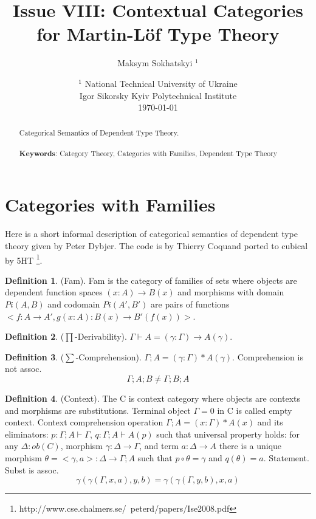 \documentclass{article}
\theoremstyle{definition}
\newtheorem{definition}{Definition}
\begin{document}
 \title{Issue VIII: Contextual Categories \\ for Martin-Löf Type Theory}
\author{Maksym Sokhatskyi $^1$}
\date{ $^1$ National Technical University of Ukraine \\
       \small Igor Sikorsky Kyiv Polytechnical Institute \\
       \today }

\maketitle

\begin{abstract}

Categorical Semantics of Dependent Type Theory.
\\
\\
{\bf Keywords}: Category Theory, Categories with Families, Dependent Type Theory
\end{abstract}
\tableofcontents

\newpage
\section{Categories with Families}

Here is a short informal description of
categorical semantics of dependent type theory given by Peter Dybjer.
The code is by Thierry Coquand ported to cubical by 5HT
\footnote{http://www.cse.chalmers.se/~peterd/papers/Ise2008.pdf}.

\begin{definition} (Fam). Fam is the category of families
of sets where objects are dependent function
spaces $(x:A)\rightarrow B(x)$ and morphisms with domain
$Pi(A,B)$ and codomain $Pi(A',B')$ are pairs of
functions $<f:A\rightarrow A',g(x:A):B(x)\rightarrow B'(f(x))>$.
\end{definition}

\begin{definition} ($\prod$-Derivability).
$\Gamma\vdash A = (\gamma:\Gamma)\rightarrow A(\gamma)$.
\end{definition}

\begin{definition} ($\sum$-Comprehension).
$\Gamma;A = (\gamma:\Gamma)*A(\gamma)$. Comprehension is not assoc.
$$
    \Gamma;A;B \neq \Gamma;B;A
$$
\end{definition}

\begin{definition} (Context).
The C is context category where objects are contexts and morphisms are substitutions.
Terminal object $\Gamma=0$ in C is called empty context.
Context comprehension operation $\Gamma;A = (x:\Gamma)*A(x)$ and
its eliminators: $p:\Gamma;A\vdash\Gamma$, $q:\Gamma;A\vdash A(p)$ such that
universal property holds: for any $\Delta:ob(C)$, morphism $\gamma:\Delta\rightarrow\Gamma$,
and term $a:\Delta\rightarrow A$ there is a unique morphism $\theta=<\gamma,a>:\Delta\rightarrow\Gamma;A$
such that $p\circ\theta=\gamma$ and $q(\theta)=a$. Statement. Subst is assoc.
$$
    \gamma(\gamma(\Gamma,x,a),y,b) = \gamma(\gamma(\Gamma,y,b),x,a)
$$
\end{definition}
\end{document}
